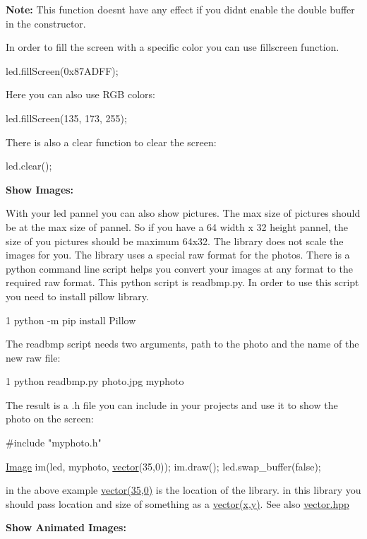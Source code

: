 {\bfseries Note\+: } This function doesn\textquotesingle{}t have any effect if you didn\textquotesingle{}t enable the double buffer in the constructor.

In order to fill the screen with a specific color you can use fillscreen function. 
\begin{DoxyCode}
led.fillScreen(0x87ADFF);
\end{DoxyCode}
 Here you can also use R\+GB colors\+: 
\begin{DoxyCode}
led.fillScreen(135, 173, 255);
\end{DoxyCode}
 There is also a clear function to clear the screen\+: 
\begin{DoxyCode}
led.clear();
\end{DoxyCode}


{\bfseries  Show Images\+: }

With your led pannel you can also show pictures. The max size of pictures should be at the max size of pannel. So if you have a 64 width x 32 height pannel, the size of you pictures should be maximum 64x32. The library does not scale the images for you. The library uses a special raw format for the photos. There is a python command line script helps you convert your images at any format to the required raw format. This python script is readbmp.\+py. In order to use this script you need to install pillow library. 
\begin{DoxyCode}
1 python -m pip install Pillow
\end{DoxyCode}
 The readbmp script needs two arguments, path to the photo and the name of the new raw file\+: 
\begin{DoxyCode}
1 python readbmp.py photo.jpg myphoto
\end{DoxyCode}
 The result is a .h file you can include in your projects and use it to show the photo on the screen\+: 
\begin{DoxyCode}
\textcolor{preprocessor}{#include "myphoto.h"}

\hyperlink{class_image}{Image} im(led, myphoto, \hyperlink{classvector}{vector}(35,0));
im.draw();
led.swap\_buffer(\textcolor{keyword}{false});
\end{DoxyCode}
 in the above example \hyperlink{classvector}{vector(35,0)} is the location of the library. in this library you should pass location and size of something as a \hyperlink{classvector}{vector(x,y)}. See also \hyperlink{vector_8hpp}{vector.\+hpp}

{\bfseries  Show Animated Images\+: }

